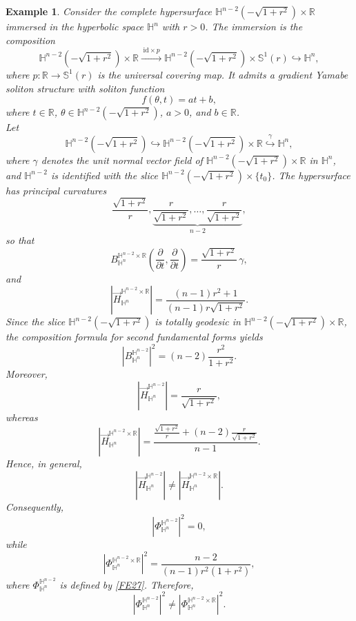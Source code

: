 \documentclass[11pt]{amsart}
\newtheorem{example}[theorem]{Example}
\numberwithin{equation}{section}
\begin{document}
\begin{example}
    Consider the complete hypersurface
    $\mathbb{H}^{n-2}\left(-\sqrt{1+r^2}\right)\times \mathbb{R}$
    immersed in the hyperbolic space $\mathbb{H}^{n}$ with $r>0$.
   The immersion is the composition
\[
\mathbb{H}^{n-2}\left(-\sqrt{1+r^2}\right)\times\mathbb{R}
\xrightarrow{\;\mathrm{id}\times p\;}
\mathbb{H}^{n-2}\left(-\sqrt{1+r^2}\right)\times\mathbb{S}^{1}(r)
\hookrightarrow
\mathbb{H}^{n},
\]
where $p:\mathbb{R}\to\mathbb{S}^{1}(r)$ is the universal covering map.
    It admits a gradient Yamabe soliton structure with soliton function
    \[
    f(\theta,t)=at+b,
    \]
    where $t\in\mathbb{R}$, $\theta\in
    \mathbb{H}^{n-2}\left(-\sqrt{1+r^2}\right)$,
    $a>0$, and $b\in\mathbb{R}$.\\
Let
    \[
    \mathbb{H}^{n-2}\left(-\sqrt{1+r^2}\right)
    \hookrightarrow
    \mathbb{H}^{n-2}\left(-\sqrt{1+r^2}\right)\times\mathbb{R}
    \overset{\gamma}{\hookrightarrow}
    \mathbb{H}^{n},
    \]
    where $\gamma$ denotes the unit normal vector field of
    $\mathbb{H}^{n-2}\left(-\sqrt{1+r^2}\right)\times\mathbb{R}$
    in $\mathbb{H}^{n}$, and
    $\mathbb{H}^{n-2}$ is identified with the slice
    $\mathbb{H}^{n-2}\left(-\sqrt{1+r^2}\right)\times\{t_0\}$.
The hypersurface has principal curvatures
    \[
    \frac{\sqrt{1+r^2}}{r},
    \underbrace{\frac{r}{\sqrt{1+r^2}},
    \ldots,
    \frac{r}{\sqrt{1+r^2}}}_{n-2},
    \]
    so that
    \[
    B^{\mathbb{H}^{n-2}\times\mathbb{R}}_{\mathbb{H}^{n}}
    \left(
    \frac{\partial}{\partial t},
    \frac{\partial}{\partial t}
    \right)
    =
    \frac{\sqrt{1+r^2}}{r}\,\gamma,
    \]
    and
\[
\left|
\vec H^{\mathbb H^{n-2}\times\mathbb R}_{\mathbb H^n}
\right|
=
\frac{(n-1)r^2+1}
{(n-1)r\sqrt{1+r^2}}.
\]
Since the slice
    $\mathbb{H}^{n-2}\left(-\sqrt{1+r^2}\right)$
    is totally geodesic in
    $\mathbb{H}^{n-2}\left(-\sqrt{1+r^2}\right)\times\mathbb{R}$, the composition formula for second fundamental forms yields
    \[
    \left|
    B^{\mathbb{H}^{n-2}}_{\mathbb{H}^{n}}
    \right|^{2}
    =
    (n-2)
    \frac{r^{2}}{1+r^{2}}.
    \]
Moreover,
    \[
    \left|
    \vec H^{\mathbb{H}^{n-2}}_{\mathbb{H}^{n}}
    \right|
    =
    \frac{r}{\sqrt{1+r^{2}}},
    \]
    whereas
    \[
    \left|
    \vec H^{\mathbb{H}^{n-2}\times\mathbb{R}}_{\mathbb{H}^{n}}
    \right|
    =
    \frac{
    \frac{\sqrt{1+r^2}}{r}
    +(n-2)\frac{r}{\sqrt{1+r^2}}
    }{n-1}.
    \]
Hence, in general,
    \[
    \left|
    \vec H^{\mathbb{H}^{n-2}}_{\mathbb{H}^{n}}
    \right|
    \neq
    \left|
    \vec H^{\mathbb{H}^{n-2}\times\mathbb{R}}_{\mathbb{H}^{n}}
    \right|.
    \]
Consequently,
    \[
    \left|
    \Phi^{\mathbb{H}^{n-2}}_{\mathbb{H}^{n}}
    \right|^{2}
    =
    0,
    \]
    while
    \[
    \left|
    \Phi^{\mathbb{H}^{n-2}\times\mathbb{R}}_{\mathbb{H}^{n}}
    \right|^{2}
    =
    \frac{n-2}
    {(n-1)r^{2}(1+r^{2})},
    \]
    where $\Phi^{\mathbb{H}^{n-2}}_{\mathbb{H}^{n}}$ is defined by \eqref{FE27}.
    Therefore,
    \[
    \left|
    \Phi^{\mathbb{H}^{n-2}}_{\mathbb{H}^{n}}
    \right|^{2}
    \neq
    \left|
    \Phi^{\mathbb{H}^{n-2}\times\mathbb{R}}_{\mathbb{H}^{n}}
    \right|^{2}.
    \]
\end{example}
\end{document}
